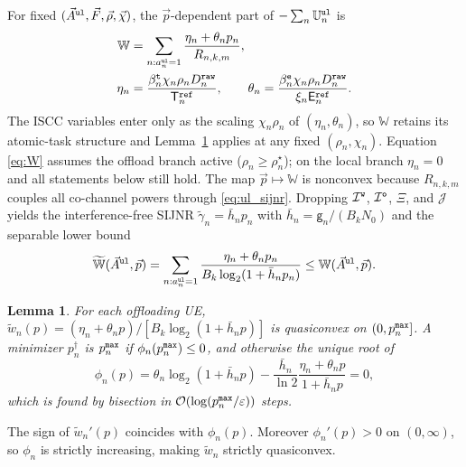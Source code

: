 \documentclass[journal]{IEEEtran}
\newtheorem{lemma}{Lemma}
\begin{document}
For fixed $(\vec{A}^{\tt ul},\vec{F},\vec{\rho},\vec{\chi})$, the $\vec{p}$-dependent part of $-\sum_n\mathbb{U}_n^{\tt ul}$ is
\begin{align}
\mathbb{W}
&=\sum_{n:a_n^{\tt ul}=1}
\frac{\eta_n+\theta_n p_n}{R_{n,k,m}},
\label{eq:W}\\
\eta_n&=\frac{\beta_n^{\tt t}\chi_n\rho_n D_n^{\tt raw}}{\mathsf{T}_n^{\tt ref}},
\qquad
\theta_n=\frac{\beta_n^{\tt e}\chi_n\rho_n D_n^{\tt raw}}{\xi_n\mathsf{E}_n^{\tt ref}}.
\nonumber
\end{align}
The ISCC variables enter only as the scaling $\chi_n\rho_n$ of $(\eta_n,\theta_n)$, so $\mathbb{W}$ retains its atomic-task structure and Lemma~\ref{lem:quasi} applies at any fixed $(\rho_n,\chi_n)$. Equation \eqref{eq:W} assumes the offload branch active ($\rho_n\ge\rho_n^\star$); on the local branch $\eta_n=0$ and all statements below still hold.
The map $\vec{p}\mapsto\mathbb{W}$ is nonconvex because $R_{n,k,m}$ couples all co-channel powers through \eqref{eq:ul_sijnr}. Dropping $\mathcal{I}^{\tt w}$, $\mathcal{I}^{\tt o}$, $\Xi$, and $\mathcal{J}$ yields the interference-free SIJNR $\tilde\gamma_{n}= \bar h_n p_n$ with $\bar h_n=\mathsf{g}_n/(B_k N_0)$ and the separable lower bound
\begin{equation}
\widetilde{\mathbb{W}}(\vec{A}^{\tt ul},\vec{p})
=\sum_{n:a_n^{\tt ul}=1}
\frac{\eta_n+\theta_n p_n}{B_k\log_2(1+\bar h_n p_n)}
\le \mathbb{W}(\vec{A}^{\tt ul},\vec{p}).
\label{eq:Wtil}
\end{equation}

\begin{lemma}\label{lem:quasi}
For each offloading UE, ${\tilde{w}}_n(p)=(\eta_n+\theta_n p)/[B_k\log_2(1+\bar h_n p)]$ is quasiconvex on $(0,p_n^{\tt max}]$. A minimizer $p_n^\dagger$ is $p_n^{\tt max}$ if $\phi_n(p_n^{\tt max})\le 0$, and otherwise the unique root of
\begin{equation}
\phi_n(p)
=\theta_n\log_2(1+\bar h_n p)
-\frac{\bar h_n}{\ln 2}\frac{\eta_n+\theta_n p}{1+\bar h_n p}=0,
\label{eq:phi}
\end{equation}
which is found by bisection in $\mathcal{O}(\log(p_n^{\tt max}/\varepsilon))$ steps.
\end{lemma}
\begin{IEEEproof}
The sign of $\tilde{w}_n'(p)$ coincides with $\phi_n(p)$. 
{Moreover $\phi_n'(p)>0$ on $(0,\infty)$, so $\phi_n$ is strictly increasing, making $\tilde{w}_n$ strictly quasiconvex.}
\end{IEEEproof}
\end{document}
